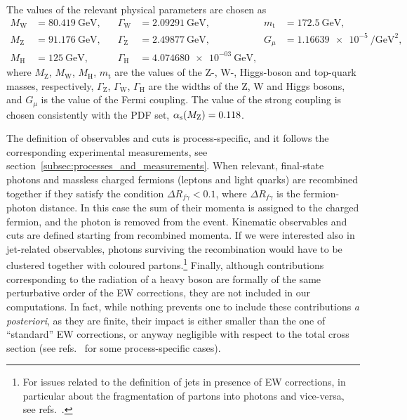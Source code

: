 The values of the relevant physical parameters are chosen as
\begin{equation}
\begin{aligned}
M_\mathrm{W} &= \SI{80.419}{\giga\electronvolt} \text{,} \quad &
\Gamma_\mathrm{W} &= \SI{2.09291}{\giga\electronvolt} \text{,} &
m_\mathrm{t} &= \SI{172.5}{\giga\electronvolt} \text{,} \quad \\
M_\mathrm{Z} &= \SI{91.176}{\giga\electronvolt} \text{,} \quad &
\Gamma_\mathrm{Z} &= \SI{2.49877}{\giga\electronvolt} \text{,} &
G_\mu &= \SI{1.16639e-5}{\per\giga\electronvolt\squared} \text{,} \\
M_\mathrm{H} &= \SI{125}{\giga\electronvolt} \text{,} &
\Gamma_\mathrm{H} &= \SI{4.074680e-03}{\giga\electronvolt} \text{,}
\end{aligned}
\label{eq:parameters}
\end{equation}
where $M_\mathrm{Z}$, $M_\mathrm{W}$, $M_\mathrm{H}$, $m_\mathrm{t}$ are the values of the Z-, W-, Higgs-boson
and top-quark masses, respectively, $\Gamma_\mathrm{Z}$, $\Gamma_\mathrm{W}$, $\Gamma_\mathrm{H}$ are the widths of
the Z, W and Higgs bosons, and $G_\mu$ is the value of the Fermi coupling. The value of the strong
coupling is chosen consistently with the PDF set, $\alpha_\mathrm{s}(M_\mathrm{Z})=0.118$.

The definition of observables and cuts is process-specific, and it follows the corresponding experimental measurements,
see section~\ref{subsec:processes_and_measurements}.
When relevant, final-state photons and massless charged fermions (leptons and light quarks) are recombined together 
if they satisfy the condition $\Delta R_{f \gamma}<0.1$, where $\Delta R_{f \gamma}$
is the fermion-photon distance. In this case the
sum of their momenta is assigned to the charged fermion, and the photon is removed
from the event. Kinematic observables and cuts are defined starting from recombined momenta. If we were interested also in jet-related observables,
photons surviving the recombination would have to be clustered together with coloured
partons.\footnote{For issues related to the definition of jets in presence of EW corrections, in particular
    about the fragmentation of partons into photons and vice-versa,
see refs.~\cite{Glover:1993xc,Frederix:2016ost,Denner:2019zfp}.} Finally, although contributions corresponding to the radiation
of a heavy boson are formally of the same perturbative order of the EW corrections, they are not included in our
computations. In fact, while nothing prevents one to include these contributions \emph{a posteriori}, as they are finite,
their impact is either smaller than the one of \enquote{standard} EW corrections, or anyway negligible with respect to
the total cross section (see refs.~\cite{Frixione:2014qaa,Frixione:2015zaa,Pagani:2016caq} for some process-specific cases).
    

